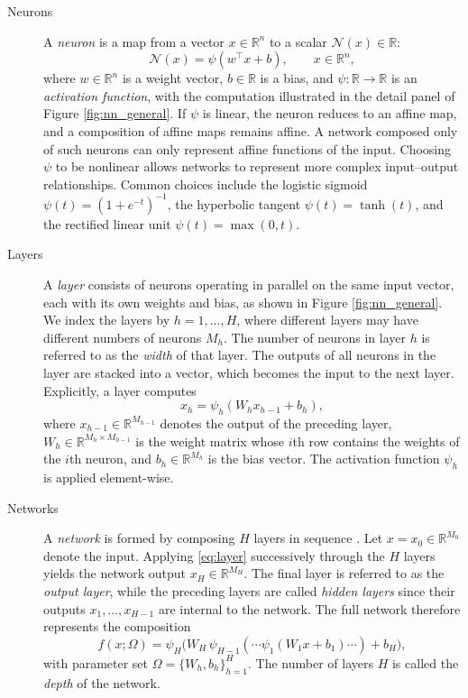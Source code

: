 \begin{description}
    \item[Neurons]
A \emph{neuron} is a map from a vector $x \in \mathbb{R}^n$ to a scalar $\mathcal{N}(x)\in \mathbb{R}$:
\begin{equation}
    \mathcal{N}(x)
    = \psi(w^\top x + b),
    \qquad x \in \mathbb{R}^n,
\label{eq:neuron}
\end{equation}
where $w \in \mathbb{R}^n$ is a weight vector, $b \in \mathbb{R}$ is a bias, and $\psi : \mathbb{R} \to \mathbb{R}$ is an \emph{activation function}, with the computation illustrated in the detail panel of Figure \ref{fig:nn_general}. If $\psi$ is linear, the neuron reduces to an affine map, and a composition of affine maps remains affine. A network composed only of such neurons can only represent affine functions of the input. Choosing $\psi$ to be nonlinear allows networks to represent more complex input--output relationships. Common choices include the logistic sigmoid $\psi(t) = (1 + e^{-t})^{-1}$, the hyperbolic tangent $\psi(t) = \tanh(t)$, and the rectified linear unit $\psi(t) = \max(0,t)$.
    
    \item[Layers]
A \emph{layer} consists of neurons operating in parallel on the same input vector, each with its own weights and bias, as shown in Figure \ref{fig:nn_general}. We index the layers by $h = 1,\dotsc,H$, where different layers may have different numbers of neurons $M_h$. The number of neurons in layer $h$ is referred to as the \emph{width} of that layer. The outputs of all neurons in the layer are stacked into a vector, which becomes the input to the next layer. Explicitly, a layer computes
\begin{equation}
    x_h = \psi_h(W_h x_{h-1} + b_h),
\label{eq:layer}
\end{equation}
where $x_{h-1} \in \mathbb{R}^{M_{h-1}}$ denotes the output of the preceding layer, $W_h \in \mathbb{R}^{M_h \times M_{h-1}}$ is the weight matrix whose $i$th row contains the weights of the $i$th neuron, and $b_h \in \mathbb{R}^{M_h}$ is the bias vector. The activation function $\psi_h$ is applied element-wise.

    \item[Networks]
A \emph{network} is formed by composing $H$ layers in sequence \citep[Ch.~6]{Goodfellow2016}. Let $x = x_0 \in \mathbb{R}^{M_0}$ denote the input. Applying \eqref{eq:layer} successively through the $H$ layers yields the network output $x_H \in \mathbb{R}^{M_H}$. The final layer is referred to as the \emph{output layer}, while the preceding layers are called \emph{hidden layers} since their outputs $x_1,\ldots,x_{H-1}$ are internal to the network. The full network therefore represents the composition
\begin{equation}
    f(x;\Omega)
    = \psi_H\!\bigl(W_H\,\psi_{H-1}(\cdots
      \psi_1(W_1 x + b_1)\cdots) + b_H\bigr),
\label{eq:network}
\end{equation}
with parameter set $\Omega = \{W_h, b_h\}_{h=1}^H$. The number of layers $H$ is called the \emph{depth} of the network.
\end{description}


